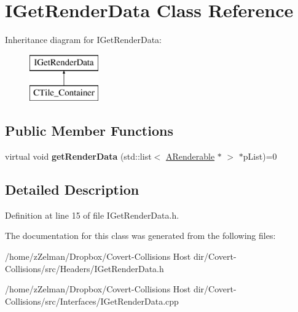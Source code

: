 \hypertarget{classIGetRenderData}{\section{I\-Get\-Render\-Data Class Reference}
\label{classIGetRenderData}
}
Inheritance diagram for I\-Get\-Render\-Data\-:\begin{figure}[H]
\begin{center}
\leavevmode
\includegraphics[height=2.000000cm]{classIGetRenderData}
\end{center}
\end{figure}
\subsection*{Public Member Functions}
\begin{DoxyCompactItemize}
\item 
\hypertarget{classIGetRenderData_ac98527f07b6d1b5030786b4848cca867}{virtual void {\bfseries get\-Render\-Data} (std\-::list$<$ \hyperlink{classARenderable}{A\-Renderable} $\ast$ $>$ $\ast$p\-List)=0}\label{classIGetRenderData_ac98527f07b6d1b5030786b4848cca867}

\end{DoxyCompactItemize}


\subsection{Detailed Description}


Definition at line 15 of file I\-Get\-Render\-Data.\-h.



The documentation for this class was generated from the following files\-:\begin{DoxyCompactItemize}
\item 
/home/z\-Zelman/\-Dropbox/\-Covert-\/\-Collisions Host dir/\-Covert-\/\-Collisions/src/\-Headers/I\-Get\-Render\-Data.\-h\item 
/home/z\-Zelman/\-Dropbox/\-Covert-\/\-Collisions Host dir/\-Covert-\/\-Collisions/src/\-Interfaces/I\-Get\-Render\-Data.\-cpp\end{DoxyCompactItemize}
